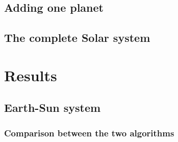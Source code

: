 \documentclass[a4paper, twoside, 11pt]{report}
\theoremstyle{theorem}
\theoremstyle{remark}
\theoremstyle{exemple}
\begin{document}
    
    \section{Adding one planet}
    
    
    \section{The complete Solar system}
    
    

\chapter{Results}
    \section{Earth-Sun system}
        \subsection{Comparison between the two algorithms}
\end{document}
